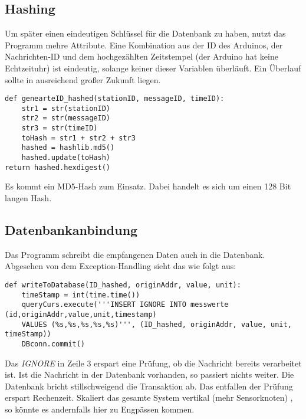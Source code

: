 \cite{pythonStruct}



\subsection{Hashing}
\label{sec:hashing}
Um später einen eindeutigen Schlüssel für die Datenbank zu haben, nutzt das Programm mehre Attribute. Eine Kombination aus der ID des Arduinos, der Nachrichten-ID und dem hochgezählten Zeitstempel (der Arduino hat keine Echtzeituhr) ist eindeutig, solange keiner dieser Variablen überläuft. Ein Überlauf sollte in ausreichend großer Zukunft liegen. 

\lstset{language=python, numbers=none, breaklines=true}
\begin{lstlisting}
def genearteID_hashed(stationID, messageID, timeID):
    str1 = str(stationID)
    str2 = str(messageID)
    str3 = str(timeID)
    toHash = str1 + str2 + str3
    hashed = hashlib.md5()
    hashed.update(toHash)
return hashed.hexdigest()
\end{lstlisting}
Es kommt ein MD5-Hash zum Einsatz. Dabei handelt es sich um einen 128 Bit langen Hash. 


\subsection{Datenbankanbindung}
\label{sec:db_verbindung}
Das Programm schreibt die empfangenen Daten auch in die Datenbank. Abgesehen von dem Exception-Handling sieht das wie folgt aus: 

\lstset{language=python, numbers=left, breaklines=true}
\begin{lstlisting}
def writeToDatabase(ID_hashed, originAddr, value, unit):
    timeStamp = int(time.time())
    queryCurs.execute('''INSERT IGNORE INTO messwerte (id,originAddr,value,unit,timestamp)
	VALUES (%s,%s,%s,%s,%s)''', (ID_hashed, originAddr, value, unit, timeStamp))
	DBconn.commit()
\end{lstlisting}
Das \textit{IGNORE} in Zeile 3 erspart eine Prüfung, ob die Nachricht bereits verarbeitet ist. Ist die Nachricht in der Datenbank vorhanden, so passiert nichts weiter. Die Datenbank bricht stillschweigend die Transaktion ab. Das entfallen der Prüfung erspart Rechenzeit. Skaliert das gesamte System vertikal (mehr Sensorknoten) , so könnte es andernfalls hier zu Engpässen kommen.   

